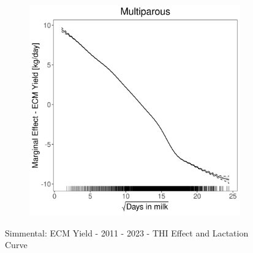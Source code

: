 \begin{figure}[H]
\begin{subfigure}[b]{0.45\textwidth}
    \end{subfigure}
    \hspace{0.05\textwidth} %
    \begin{subfigure}[b]{0.45\textwidth}
        \centering
        \includegraphics[width=\textwidth]{thesis/figures/models/ecm/after2010/si_ecm_after2010/si_ecm_after2010_marginal_dim_milk_multi.png}
    \end{subfigure}
    \caption[]{Simmental: ECM Yield - 2011 - 2023 - THI Effect and Lactation Curve}
    \label{fig:main}
\end{figure}

